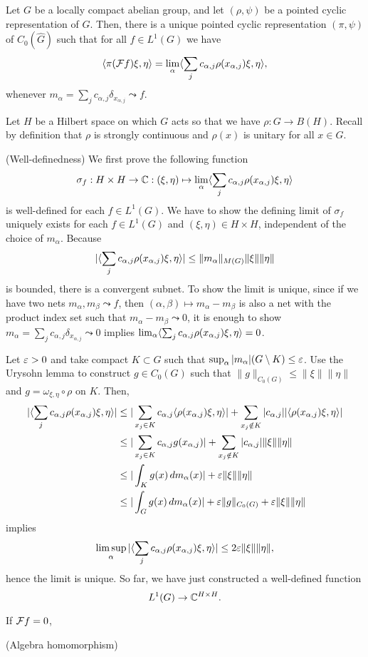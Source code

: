 \documentclass{../../small}
\begin{document}
\begin{thm}
Let $G$ be a locally compact abelian group, and let $(\rho,\psi)$ be a pointed cyclic representation of $G$.
Then, there is a unique pointed cyclic representation $(\pi,\psi)$ of $C_0(\hat G)$ such that for all $f\in L^1(G)$ we have
\[\langle\pi(\mathcal{F} f)\xi,\eta\rangle=\lim_\alpha\langle\sum_jc_{\alpha,j}\rho(x_{\alpha,j})\xi,\eta\rangle,\]
whenever $m_\alpha=\sum_jc_{\alpha,j}\delta_{x_{\alpha,j}}\leadsto f$.
\end{thm}
\begin{pf}
Let $H$ be a Hilbert space on which $G$ acts so that we have $\rho:G\to B(H)$.
Recall by definition that $\rho$ is strongly continuous and $\rho(x)$ is unitary for all $x\in G$.

(Well-definedness)
We first prove the following function
\[\sigma_f:H\times H\to\mathbb{C}:(\xi,\eta)\mapsto\lim_\alpha\langle\sum_jc_{\alpha,j}\rho(x_{\alpha,j})\xi,\eta\rangle\]
is well-defined for each $f\in L^1(G)$.
We have to show the defining limit of $\sigma_f$ uniquely exists for each $f\in L^1(G)$ and $(\xi,\eta)\in H\times H$, independent of the choice of $m_\alpha$.
Because
\[|\langle\sum_jc_{\alpha,j}\rho(x_{\alpha,j})\xi,\eta\rangle|\le\|m_\alpha\|_{M(G)}\|\xi\|\|\eta\|\]
is bounded, there is a convergent subnet.
To show the limit is unique, since if we have two nets $m_\alpha,m_\beta\leadsto f$, then $(\alpha,\beta)\mapsto m_\alpha-m_\beta$ is also a net with the product index set such that $m_\alpha-m_\beta\leadsto 0$, it is enough to show $m_\alpha=\sum_jc_{\alpha,j}\delta_{x_{\alpha,j}}\leadsto0$ implies $\lim_\alpha\langle\sum_jc_{\alpha,j}\rho(x_{\alpha,j})\xi,\eta\rangle=0$.

Let $\varepsilon>0$ and take compact $K\subset G$ such that $\sup_\alpha|m_\alpha|(G\setminus K)\le\varepsilon$.
Use the Urysohn lemma to construct $g\in C_0(G)$ such that $\|g\|_{C_0(G)}\le\|\xi\|\|\eta\|$ and $g=\omega_{\xi,\eta}\circ\rho$ on $K$.
Then,
\begin{align*}
|\langle\sum_jc_{\alpha,j}\rho(x_{\alpha,j})\xi,\eta\rangle|
&\le|\sum_{x_j\in K}c_{\alpha,j}\langle\rho(x_{\alpha,j})\xi,\eta\rangle|+\sum_{x_j\notin K}|c_{\alpha,j}||\langle\rho(x_{\alpha,j})\xi,\eta\rangle|\\
&\le|\sum_{x_j\in K}c_{\alpha,j}g(x_{\alpha,j})|+\sum_{x_j\notin K}|c_{\alpha,j}|\|\xi\|\|\eta\|\\
&\le|\int_K g(x)\,dm_\alpha(x)|+\varepsilon\|\xi\|\|\eta\|\\
&\le|\int_G g(x)\,dm_\alpha(x)|+\varepsilon\|g\|_{C_0(G)}+\varepsilon\|\xi\|\|\eta\|
\end{align*}
implies
\[\limsup_\alpha|\langle\sum_jc_{\alpha,j}\rho(x_{\alpha,j})\xi,\eta\rangle|\le2\varepsilon\|\xi\|\|\eta\|,\]
hence the limit is unique.
So far, we have just constructed a well-defined function
\[L^1(G)\to\mathbb{C}^{H\times H}.\]

If $\mathcal{F} f=0$,

(Algebra homomorphism)


\end{pf}
\end{document}
